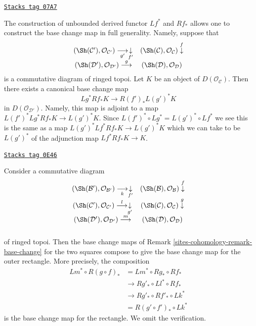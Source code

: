 \begin{remark}
\label{sites-cohomology-remark-base-change}
\href{https://stacks.math.columbia.edu/tag/07A7}{\texttt{Stacks tag 07A7}}

The construction of unbounded derived functor $Lf^*$ and $Rf_*$
allows one to construct the base change map in full generality.
Namely, suppose that
$$
\begin{array}{cc}(\Sh(\mathcal{C}'), \mathcal{O}_{\mathcal{C}'})
\underset{g'}{\longrightarrow}\underset{f'}{\downarrow} & (\Sh(\mathcal{C}), \mathcal{O}_\mathcal{C}) \overset{f}{\downarrow} \\ (\Sh(\mathcal{D}'), \mathcal{O}_{\mathcal{D}'})
\overset{g}{\longrightarrow} & (\Sh(\mathcal{D}), \mathcal{O}_\mathcal{D})\end{array}
$$
is a commutative diagram of ringed topoi. Let $K$ be an object of
$D(\mathcal{O}_\mathcal{C})$.
Then there exists a canonical base change map
$$
Lg^*Rf_*K \longrightarrow R(f')_*L(g')^*K
$$
in $D(\mathcal{O}_{\mathcal{D}'})$. Namely, this map is adjoint to a map
$L(f')^*Lg^*Rf_*K \to L(g')^*K$.
Since $L(f')^* \circ Lg^* = L(g')^* \circ Lf^*$ we see this is the same
as a map $L(g')^*Lf^*Rf_*K \to L(g')^*K$
which we can take to be $L(g')^*$ of the adjunction map
$Lf^*Rf_*K \to K$.
\end{remark}

\begin{remark}
\label{sites-cohomology-remark-compose-base-change}
\href{https://stacks.math.columbia.edu/tag/0E46}{\texttt{Stacks tag 0E46}}

Consider a commutative diagram
$$
\begin{array}{cc}(\Sh(\mathcal{B}'), \mathcal{O}_{\mathcal{B}'})
\underset{k}{\longrightarrow}\underset{f'}{\downarrow} & (\Sh(\mathcal{B}), \mathcal{O}_\mathcal{B}) \overset{f}{\downarrow} \\ (\Sh(\mathcal{C}'), \mathcal{O}_{\mathcal{C}'})
\overset{l}{\longrightarrow}\underset{g'}{\downarrow} & (\Sh(\mathcal{C}), \mathcal{O}_\mathcal{C}) \overset{g}{\downarrow} \\ (\Sh(\mathcal{D}'), \mathcal{O}_{\mathcal{D}'})
\overset{m}{\longrightarrow} & (\Sh(\mathcal{D}), \mathcal{O}_\mathcal{D}) \\  & \end{array}
$$
of ringed topoi. Then the base change maps of
Remark \ref{sites-cohomology-remark-base-change}
for the two squares compose to give the base
change map for the outer rectangle. More precisely,
the composition
\begin{align*}
Lm^* \circ R(g \circ f)_*
& =
Lm^* \circ Rg_* \circ Rf_* \\
& \to Rg'_* \circ Ll^* \circ Rf_* \\
& \to Rg'_* \circ Rf'_* \circ Lk^* \\
& = R(g' \circ f')_* \circ Lk^*
\end{align*}
is the base change map for the rectangle. We omit the verification.
\end{remark}

